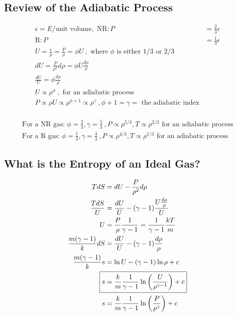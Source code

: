 \documentclass[10pt,letterpaper,final]{book}
\newcommand{\pt}{\propto}
\newcommand{\rp}{\right)}
\newcommand{\lp}{\left(}
\begin{document}
\subsection{Review of the Adiabatic Process}

\begin{align}
\epsilon = E/\text{unit volume},\text{ NR}: P &= \frac{2}{3} \epsilon\\
\text{R}: P &= \frac{1}{3} \epsilon\\
U = \frac{\epsilon}{\rho} = \frac{P}{\rho} = \phi U~,\text{ where $\phi$ is either $1/3$ or $2/3$}\\
dU = \frac{P}{\rho^2}d\rho = \phi U\frac{d\rho}{\rho}\\
\frac{dU}{U} = \phi \frac{d\rho}{\rho}\\
U \pt \rho^\phi~,\text{ for an adiabatic process}\\
P \pt \rho U \pt \rho ^{\phi+1} \pt \rho^{\gamma}~,  \phi + 1  = \gamma =\text{ the adiabatic index}\\
\end{align}

\begin{align}
\text{For a NR gas: } \phi = \frac{2}{3}, \gamma = \frac{5}{3}~,P\pt \rho^{5/3}, T \pt \rho^{2/3}\text{ for an adiabatic process}\\
\text{For a R gas: } \phi = \frac{1}{3}, \gamma = \frac{4}{3}~,P\pt \rho^{4/3}, T \pt \rho^{1/3}\text{ for an adiabatic process}
\end{align}

\subsection{What is the Entropy of an Ideal Gas?}

\begin{align}
TdS &= dU - \frac{P}{\rho^2}d\rho\\
\frac{TdS}{U} &= \frac{dU}{U} - (\gamma - 1)\frac{U\frac{d\rho}{\rho}}{U}\\
U &=\frac{P}{\rho}\frac{1}{\gamma -1} = \frac{1}{\gamma - 1} \frac{kT}{m}\\
\frac{m(\gamma -1)}{k}dS &= \frac{dU}{U} - (\gamma -1)\frac{d\rho}{\rho}\\
\frac{m(\gamma - 1)}{k}s &= \ln U - (\gamma - 1)\ln \rho + c\\
\Aboxed{s &= \frac{k}{m}\frac{1}{\gamma - 1} \ln \lp \frac{U}{\rho^{\gamma - 1}} \rp  +c}\\	
s &= \frac{k}{m} \frac{1}{\gamma -1} \ln \lp \frac{P}{\rho^\gamma} \rp + c
\end{align}
\end{document}
